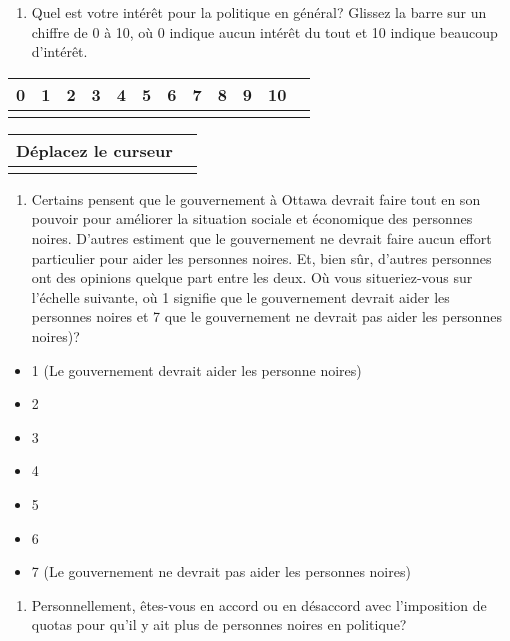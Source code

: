 \documentclass[
  letterpaper,
  DIV=11,
  numbers=noendperiod]{scrreprt}
\providecommand{\tightlist}{%
  \setlength{\itemsep}{0pt}\setlength{\parskip}{0pt}}\usepackage{longtable,booktabs,array}
\begin{document}
\begin{enumerate}
\def\labelenumi{\arabic{enumi}.}
\setcounter{enumi}{43}
\tightlist
\item
  Quel est votre intérêt pour la politique en général? Glissez la barre
  sur un chiffre de 0 à 10, où 0 indique aucun intérêt du tout et 10
  indique beaucoup d'intérêt.
\end{enumerate}

\begin{longtable}[]{@{}llllllllllll@{}}
\toprule\noalign{}
0 & 1 & 2 & 3 & 4 & 5 & 6 & 7 & 8 & 9 & 10 & \\
\midrule\noalign{}
\endhead
\bottomrule\noalign{}
\endlastfoot
\end{longtable}

\begin{longtable}[]{@{}ll@{}}
\toprule\noalign{}
Déplacez le curseur & \\
\midrule\noalign{}
\endhead
\bottomrule\noalign{}
\endlastfoot
\end{longtable}

\begin{enumerate}
\def\labelenumi{\arabic{enumi}.}
\setcounter{enumi}{44}
\tightlist
\item
  Certains pensent que le gouvernement à Ottawa devrait faire tout en
  son pouvoir pour améliorer la situation sociale et économique des
  personnes noires. D'autres estiment que le gouvernement ne devrait
  faire aucun effort particulier pour aider les personnes noires. Et,
  bien sûr, d'autres personnes ont des opinions quelque part entre les
  deux. Où vous situeriez-vous sur l'échelle suivante, où 1 signifie que
  le gouvernement devrait aider les personnes noires et 7 que le
  gouvernement ne devrait pas aider les personnes noires)?
\end{enumerate}

\begin{itemize}
\tightlist
\item
  1 (Le gouvernement devrait aider les personne noires)
\item
  2
\item
  3
\item
  4
\item
  5
\item
  6
\item
  7 (Le gouvernement ne devrait pas aider les personnes noires)
\end{itemize}

\begin{enumerate}
\def\labelenumi{\arabic{enumi}.}
\setcounter{enumi}{45}
\tightlist
\item
  Personnellement, êtes-vous en accord ou en désaccord avec l'imposition
  de quotas pour qu'il y ait plus de personnes noires en politique?
\end{enumerate}
\end{document}
